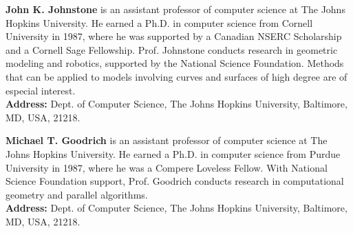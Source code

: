 \clearpage

\noindent
{\bf John K. Johnstone} is an assistant professor of computer science at The Johns Hopkins
University.  
He earned a Ph.D. in computer science from Cornell University in 1987, where he 
was supported by a Canadian NSERC Scholarship and a Cornell Sage Fellowship.
Prof. Johnstone conducts research in geometric modeling and robotics,
supported by the National Science Foundation.
Methods that can be applied to models involving curves and surfaces of
high degree are of especial interest.\\
{\bf Address:} Dept. of Computer Science, The Johns Hopkins University, Baltimore, MD,
USA, 21218.

\vspace{10ex}

\noindent
{\bf Michael T. Goodrich} is an assistant professor of computer science at 
The Johns Hopkins University.   
He earned a Ph.D. in computer science from Purdue University in 1987, where he was a Compere
Loveless Fellow.  
With National Science Foundation support, 
Prof. Goodrich conducts research in computational
geometry and parallel algorithms.\\
{\bf Address:} Dept. of Computer Science, The Johns Hopkins University, Baltimore, MD,
USA, 21218.


